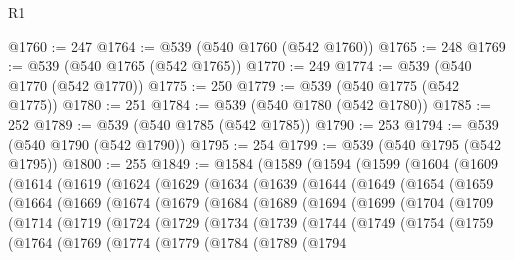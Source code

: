\begin{lexlean}{R1}
\begin{coremodule}
{{{{{{{{{{{{{{{{{{{{{{{{{{{{{{{{{{{{{{{{@1760 := 247
@1764 := @539 (@540 @1760 (@542 @1760))
@1765 := 248
@1769 := @539 (@540 @1765 (@542 @1765))
@1770 := 249
@1774 := @539 (@540 @1770 (@542 @1770))
@1775 := 250
@1779 := @539 (@540 @1775 (@542 @1775))
@1780 := 251
@1784 := @539 (@540 @1780 (@542 @1780))
@1785 := 252
@1789 := @539 (@540 @1785 (@542 @1785))
@1790 := 253
@1794 := @539 (@540 @1790 (@542 @1790))
@1795 := 254
@1799 := @539 (@540 @1795 (@542 @1795))
@1800 := 255
@1849 := @1584
    (@1589
      (@1594
        (@1599
          (@1604
            (@1609
              (@1614
                (@1619
                  (@1624
                    (@1629
                      (@1634
                        (@1639
                          (@1644
                            (@1649
                              (@1654
                                (@1659
                                  (@1664
                                    (@1669
                                      (@1674
                                        (@1679
                                          (@1684
                                            (@1689
                                              (@1694
                                                (@1699
                                                  (@1704
                                                    (@1709
                                                      (@1714
                                                        (@1719
                                                          (@1724
                                                            (@1729
                                                              (@1734
                                                                (@1739
                                                                  (@1744
                                                                    (@1749
                                                                      (@1754
                                                                        (@1759
                                                                          (@1764
                                                                            (@1769
                                                                              (@1774
                                                                                (@1779
                                                                                  (@1784
                                                                                    (@1789
                                                                                      (@1794
}}}}}}}}}}}}}}}}}}}}}}}}}}}}}}}}}}}}}}}}
\end{coremodule}
\end{lexlean}
